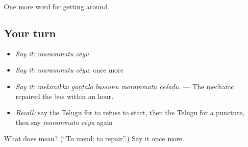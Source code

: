\begin{grammarlens}[title={What you've built}]
One more word for getting around.
\end{grammarlens}

\subsection*{Your turn}
\begin{itemize}
\raggedright
  \item \emph{Say it:} \emph{marammatu cēyu}
  \item \emph{Say it:} \emph{marammatu cēyu}, once more
  \item \emph{Say it:} \emph{mekānikku gaṇṭalō bassunu marammatu cēśāḍu.} — The mechanic repaired the bus within an hour.
  \item \emph{Recall:} say the Telugu for to refuse to start, then the Telugu for a puncture, then say \emph{marammatu cēyu} again
\end{itemize}

\begin{tcolorbox}[breakable,colback=teal!4,colframe=teal!35!black,title={Before you move on}]
What does   mean? (\textquotedblleft{}To mend; to repair\textquotedblright{}.) Say it once more.
\end{tcolorbox}
